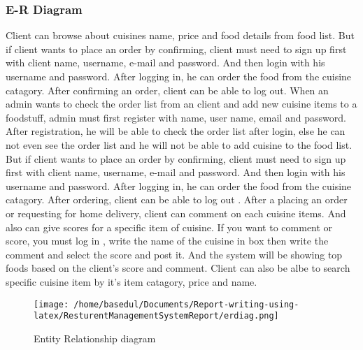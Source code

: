 \documentclass[12pt,a4paper]{article}
\newcommand\tab[1][1cm]{\hspace*{#1}}
\begin{document}
	\subsubsection{E-R Diagram}
		\tab Client can browse about cuisines name, price and food details from food list. But if client wants to place an order by confirming, client must need to sign up first with client name, username, e-mail and password. And then login with his username and password. After logging in, he can order the food from the cuisine catagory. After confirming an order, client can be able to log out. When an admin wants to check the order list from an client and add new cuisine items to a foodstuff, admin must first register with name, user name, email and password. After registration, he will be able to check the order list after login, else he can not even see the order list and he will not be able to add cuisine to the food list. But if client wants to place an order by confirming, client must need to sign up first with client name, username, e-mail and password. And then login with his username and password. After logging in, he can order the food from the cuisine catagory. After ordering, client can be able to log out . After a placing an order or requesting for home delivery, client can comment on each cuisine items. And also can give scores for a specific item of cuisine. If you want to comment or score, you must log in , write the name of the cuisine in box then write the comment and select the score and post it. And the system will be showing top foods based on the client's score and comment. Client can also be albe to search specific cuisine item by it's item catagory, price and name.	
	
		\begin{figure}[H]
		\centering
		\texttt{[image: /home/basedul/Documents/Report-writing-using-latex/ResturentManagementSystemReport/erdiag.png]}
		\caption{Entity Relationship diagram}
		\label{fig:erdig} 
	\end{figure}
	
\end{document}
